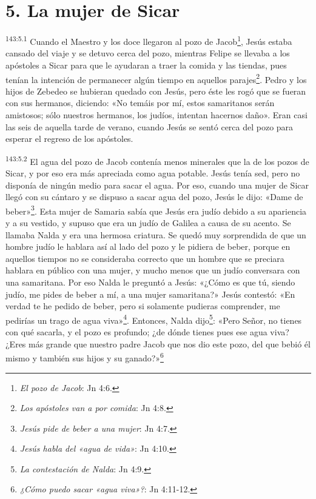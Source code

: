 \section*{5. La mujer de Sicar}
\par
\textsuperscript{143:5.1} Cuando el Maestro y los doce llegaron al pozo de Jacob\footnote{\textit{El pozo de Jacob}: Jn 4:6.}, Jesús estaba cansado del viaje y se detuvo cerca del pozo, mientras Felipe se llevaba a los apóstoles a Sicar para que le ayudaran a traer la comida y las tiendas, pues tenían la intención de permanecer algún tiempo en aquellos parajes\footnote{\textit{Los apóstoles van a por comida}: Jn 4:8.}. Pedro y los hijos de Zebedeo se hubieran quedado con Jesús, pero éste les rogó que se fueran con sus hermanos, diciendo: «No temáis por mí, estos samaritanos serán amistosos; sólo nuestros hermanos, los judíos, intentan hacernos daño». Eran casi las seis de aquella tarde de verano, cuando Jesús se sentó cerca del pozo para esperar el regreso de los apóstoles.

\par
\textsuperscript{143:5.2} El agua del pozo de Jacob contenía menos minerales que la de los pozos de Sicar, y por eso era más apreciada como agua potable. Jesús tenía sed, pero no disponía de ningún medio para sacar el agua. Por eso, cuando una mujer de Sicar llegó con su cántaro y se dispuso a sacar agua del pozo, Jesús le dijo: «Dame de beber»\footnote{\textit{Jesús pide de beber a una mujer}: Jn 4:7.}. Esta mujer de Samaria sabía que Jesús era judío debido a su apariencia y a su vestido, y supuso que era un judío de Galilea a causa de su acento. Se llamaba Nalda y era una hermosa criatura. Se quedó muy sorprendida de que un hombre judío le hablara así al lado del pozo y le pidiera de beber, porque en aquellos tiempos no se consideraba correcto que un hombre que se preciara hablara en público con una mujer, y mucho menos que un judío conversara con una samaritana. Por eso Nalda le preguntó a Jesús: «¿Cómo es que tú, siendo judío, me pides de beber a mí, a una mujer samaritana?» Jesús contestó: «En verdad te he pedido de beber, pero si solamente pudieras comprender, me pedirías un trago de agua viva»\footnote{\textit{Jesús habla del «agua de vida»}: Jn 4:10.}. Entonces, Nalda dijo\footnote{\textit{La contestación de Nalda}: Jn 4:9.}: «Pero Señor, no tienes con qué sacarla, y el pozo es profundo; ¿de dónde tienes pues ese agua viva? ¿Eres más grande que nuestro padre Jacob que nos dio este pozo, del que bebió él mismo y también sus hijos y su ganado?»\footnote{\textit{¿Cómo puedo sacar «agua viva»?}: Jn 4:11-12.}

